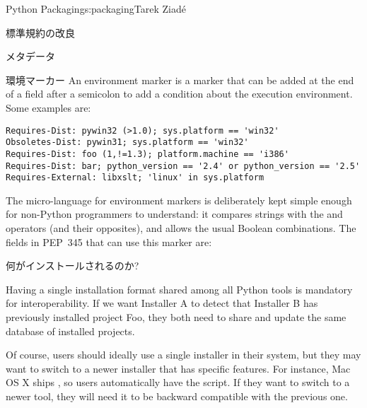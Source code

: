 \begin{aosachapter}{Python Packaging}{s:packaging}{Tarek Ziad\'{e}}
\begin{aosasect1}{標準規約の改良}
\begin{aosasect2}{メタデータ}
\begin{aosasect3}{環境マーカー}
An environment marker is a marker that can be added at the end of a
field after a semicolon to add a condition about the execution
environment.  Some examples are:

\begin{verbatim}
Requires-Dist: pywin32 (>1.0); sys.platform == 'win32'
Obsoletes-Dist: pywin31; sys.platform == 'win32'
Requires-Dist: foo (1,!=1.3); platform.machine == 'i386'
Requires-Dist: bar; python_version == '2.4' or python_version == '2.5'
Requires-External: libxslt; 'linux' in sys.platform
\end{verbatim}

The micro-language for environment markers is deliberately kept simple
enough for non-Python programmers to understand: it compares strings
with the \code{==} and  operators (and their opposites), and
allows the usual Boolean combinations.  The fields in PEP~345 that can
use this marker are:

\begin{aosaitemize}
  \item {}
  \item {}
  \item {}
  \item {}
  \item {}
  \item {}
\end{aosaitemize}

\end{aosasect3}

\end{aosasect2}

\begin{aosasect2}{何がインストールされるのか?}

Having a single installation format shared among all Python tools is
mandatory for interoperability. If we want Installer A to detect that
Installer B has previously installed project Foo, they both need to
share and update the same database of installed projects.

Of course, users should ideally use a single installer in their
system, but they may want to switch to a newer installer that has
specific features. For instance, Mac OS X ships , so
users automatically have the  script. If they
want to switch to a newer tool, they will need it to be backward
compatible with the previous one.


\end{aosasect2}
\end{aosasect1}
\end{aosachapter}
